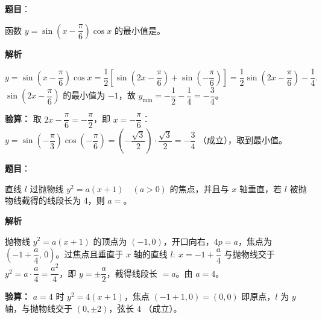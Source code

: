 \begin{answer}

\textbf{题目}：

函数 $y=\sin\left(x-\dfrac\pi6\right)\cos x$ 的最小值是\underline{\qquad\qquad}。

\textbf{解析}

\nopagebreak[4]
\[y=\sin\left(x-\frac{\pi}{6}\right)\cos x=\frac12\left[\sin\left(2x-\frac{\pi}{6}\right)+\sin\left(-\frac{\pi}{6}\right)\right]=\frac12\sin\left(2x-\frac{\pi}{6}\right)-\frac14.\]
$\sin\left(2x-\dfrac{\pi}{6}\right)$ 的最小值为 $-1$，故 $y_{\min}=-\dfrac12-\dfrac14=-\dfrac34$。

\textbf{验算：} 取 $2x-\dfrac{\pi}{6}=-\dfrac{\pi}{2}$，即 $x=-\dfrac{\pi}{6}$：$y=\sin\left(-\dfrac{\pi}{3}\right)\cos\left(-\dfrac{\pi}{6}\right)=\left(-\dfrac{\sqrt3}{2}\right)\cdot\dfrac{\sqrt3}{2}=-\dfrac34$ （成立），取到最小值。


\par\medskip

\end{answer}
\begin{answer}

\textbf{题目}：

直线 $l$ 过抛物线 $y^2=a(x+1)\quad(a>0)$ 的焦点，并且与 $x$ 轴垂直，若 $l$ 被抛物线截得的线段长为 $4$，则 $a=$\underline{\qquad\qquad}。

\textbf{解析}

抛物线 $y^2=a(x+1)$ 的顶点为 $(-1,0)$，开口向右，$4p=a$，焦点为 $\left(-1+\dfrac a4,\,0\right)$。过焦点且垂直于 $x$ 轴的直线 $l:\ x=-1+\dfrac a4$ 与抛物线交于 $y^2=a\cdot\dfrac a4=\dfrac{a^2}{4}$，即 $y=\pm\dfrac a2$，截得线段长 $=a$。由 $a=4$。

\textbf{验算：} $a=4$ 时 $y^2=4(x+1)$，焦点 $\left(-1+1,0\right)=(0,0)$ 即原点，$l$ 为 $y$ 轴，与抛物线交于 $(0,\pm2)$，弦长 $4$ （成立）。


\par\medskip

\end{answer}
